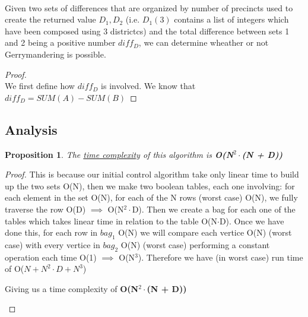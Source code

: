 \documentclass[12pt]{article}
\newtheorem{proposition}[theorem]{Proposition}
\begin{document}
\begin{corallary}
~ \\ \indent Given two sets of differences that are organized by number of precincts used to create the returned
value $D_1, D_2$ (i.e. $D_1(3)$ contains a list of integers which have been composed using 3 districtcs) and the
total difference between sets 1 and 2 being a positive number $diff_D$, we can determine wheather or not
Gerrymandering is possible.
\end{corallary}

\begin{proof}
~ \\ \indent We first define how $diff_D$ is involved. We know that $diff_D = SUM(A) - SUM(B)$
\end{proof}

\subsection{Analysis}

\begin{proposition}
\label{numq}
The \underline{time complexity} of this algorithm is \textbf{O(N$^2\cdot$(N + D))}
\end{proposition}

\begin{proof}
This is because our initial control algorithm take only linear time to build up the two sets O(N),
then we make two boolean tables, each one involving: for each element in the set O(N), for each of the
N rows (worst case) O(N), we fully traverse the row O(D) $\implies$ O(N$^2\cdot$D). Then we create a bag
for each one of the tables which takes linear time in relation to the table O(N$\cdot$D). Once we have
done this, for each row in $bag_1$ O(N) we will compare each vertice O(N) (worst case) with every vertice
in $bag_2$ O(N) (worst case) performing a constant operation each time O(1) $\implies$ O(N$^3$). Therefore
we have (in worst case) run time of O($N + N^2\cdot D + N^3$)
\begin{center}
    Giving us a time complexity of \textbf{O(N$^2\cdot$(N + D))}
\end{center}
\end{proof}

%

\end{document}
